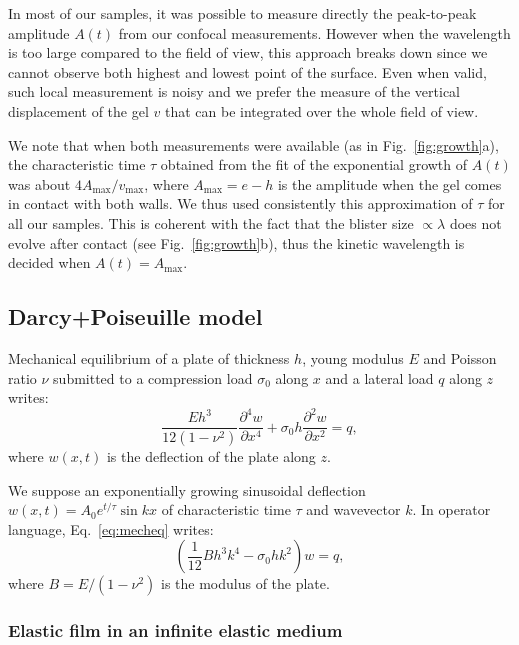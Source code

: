 \documentclass[twocolumn,superscriptaddress,showpacs,preprintnumbers,amsmath,amssymb,prl]{revtex4-1}
\begin{document}
In most of our samples, it was possible to measure directly the peak-to-peak amplitude $A(t)$ from our confocal measurements. However when the wavelength is too large compared to the field of view, this approach breaks down since we cannot observe both highest and lowest point of the surface. Even when valid, such local measurement is noisy and we prefer the measure of the vertical displacement of the gel $v$ that can be integrated over the whole field of view.

We note that when both measurements were available (as in Fig.~\ref{fig:growth}a), the characteristic time $\tau$ obtained from the fit of the exponential growth of $A(t)$ was about $4A_\text{max}/v_\text{max}$, where $A_\text{max} = e-h$ is the amplitude when the gel comes in contact with both walls. We thus used consistently this approximation of $\tau$ for all our samples. This is coherent with the fact that the blister size $\propto\lambda$ does not evolve after contact (see Fig.~\ref{fig:growth}b), thus the kinetic wavelength is decided when $A(t) = A_\text{max}$.

\subsection*{Darcy+Poiseuille model}

Mechanical equilibrium of a plate of thickness $h$, young modulus $E$ and Poisson ratio $\nu$ submitted to a compression load $\sigma_0$ along $x$ and a lateral load $q$ along $z$ writes:
\begin{equation}
\frac{E h^3}{12(1-\nu^2)}\frac{\partial^4 w}{\partial x^4} + \sigma_0 h \frac{\partial^2 w}{\partial x^2} = q,
\label{eq:mecheq}
\end{equation}
where $w(x,t)$ is the deflection of the plate along $z$.

We suppose an exponentially growing sinusoidal deflection $w(x,t) =  A_0 e^{t/\tau} \sin kx$ of characteristic time $\tau$ and wavevector $k$. In operator language, Eq.~\ref{eq:mecheq} writes:
\begin{equation}
\left(\frac{1}{12} B h^3 k^4 - \sigma_0 h k^2\right)w = q,
\label{eq:mecheqop}
\end{equation}
where $B=E/(1-\nu^2)$ is the modulus of the plate.

\subsubsection*{Elastic film in an infinite elastic medium}
\end{document}
